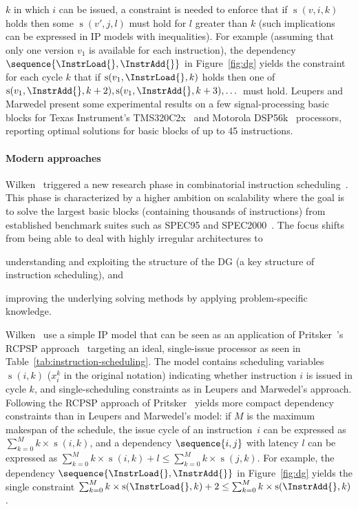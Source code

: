 \documentclass[acmsmall,authorversion,nonacm]{acmart}
\newcommand{\noMathVar}[2]{\operatorname{#1}(#2)}
\newcommand{\var}[2]{$\noMathVar{#1}{#2}$}
\begin{document}
$k$ in which $i$ can be issued, a constraint is needed to enforce that
if \var{s}{v,i,k} holds then some \var{s}{v',j,l} must hold for $l$
greater than $k$ (such implications can be expressed in IP models with
inequalities).
For example (assuming that only one version $v_1$ is available for
each instruction), the dependency $\sequence{\InstrLoad{},
  \InstrAdd{}}$ in Figure~\ref{fig:dg} yields the constraint for each
cycle $k$ that if $\noMathVar{s}{v_1,\InstrLoad{},k}$ holds then one
of $\noMathVar{s}{v_1,\InstrAdd{},k + 2},
\noMathVar{s}{v_1,\InstrAdd{},k + 3}, \dots$ must hold.
Leupers and Marwedel present some experimental results on a few
signal-processing basic blocks for Texas Instrument's TMS320C2x~\cite{C2x} and
Motorola DSP56k~\cite{Kloker1987} processors, reporting optimal
solutions for basic blocks of up to 45 instructions.

\paragraph{Modern approaches}

Wilken~\etal{} triggered a new research phase in combinatorial
instruction scheduling~\cite{Wilken2000}.
This phase is characterized by a higher ambition on scalability where
the goal is to solve the largest basic blocks (containing thousands of
instructions) from established benchmark suites such as SPEC95 and
SPEC2000~\cite{CPU}.
The focus shifts from being able to deal with highly irregular
architectures to
\begin{inparaitem}[]
\item understanding and exploiting the structure of the DG (a key
  structure of instruction scheduling), and
\item improving the underlying solving methods by applying
  problem-specific knowledge.
\end{inparaitem}

Wilken~\etal{} use a simple IP model that can be seen as an
application of Pritsker~\etal{}'s RCPSP approach~\cite{Pritsker1969}
targeting an ideal, single-issue processor as seen in
Table~\ref{tab:instruction-scheduling}.
The model contains scheduling variables \var{s}{i,k} ($x^k_i$ in the
original notation) indicating whether instruction $i$ is issued in
cycle $k$, and single-scheduling constraints as in Leupers and
Marwedel's approach.
Following the RCPSP approach of Pritsker~\etal{} yields more compact
dependency constraints than in Leupers and Marwedel's model: if $M$
is the maximum makespan of the schedule, the issue cycle of an
instruction~$i$ can be expressed as $\sum_{k = 0}^{M} k \times
\noMathVar{s}{i,k}$, and a dependency $\sequence{i,j}$ with latency
$l$ can be expressed as $\sum_{k = 0}^{M} k \times \noMathVar{s}{i,k}
+ l \le \sum_{k = 0}^{M} k \times \noMathVar{s}{j,k}$.
For example, the dependency $\sequence{\InstrLoad{}, \InstrAdd{}}$ in
Figure~\ref{fig:dg} yields the single constraint $\sum_{k = 0}^{M} k
\times \noMathVar{s}{\InstrLoad{},k} + 2 \le \sum_{k = 0}^{M} k \times
\noMathVar{s}{\InstrAdd{},k}$.
\end{document}
